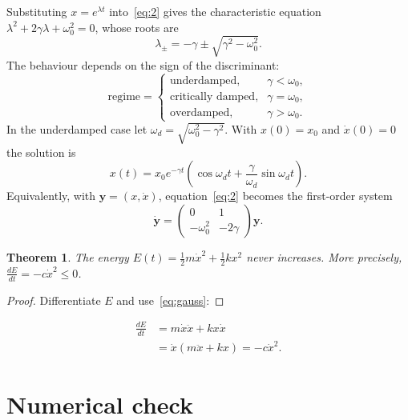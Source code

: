 \documentclass[11pt,a4paper]{article}
\newtheorem{theorem}{Theorem}
\begin{document}
Substituting $x=e^{\lambda t}$ into~\eqref{eq:2} gives the characteristic equation $\lambda^{2}+2\gamma\lambda+\omega_{0}^{2}=0$, whose roots are
\begin{equation}
  \lambda_{\pm}=-\gamma\pm\sqrt{\gamma^{2}-\omega_{0}^{2}}.
\end{equation}
The behaviour depends on the sign of the discriminant:
\begin{equation*}
  \text{regime}=\begin{cases}
\text{underdamped,} & \gamma<\omega_{0}, \\
\text{critically damped,} & \gamma=\omega_{0}, \\
\text{overdamped,} & \gamma>\omega_{0}.
\end{cases}
\end{equation*}
In the underdamped case let $\omega_{d}=\sqrt{\omega_{0}^{2}-\gamma^{2}}$. With $x(0)=x_{0}$ and $\dot{x}(0)=0$ the solution is
\begin{equation}
  x(t)=x_{0}e^{-\gamma t}\left( \cos\omega_{d}t+\frac{\gamma}{\omega_{d}}\sin\omega_{d}t \right).
  \label{eq:cos-dsin}
\end{equation}
Equivalently, with $\mathbf{y}=(x,\dot{x})$, equation~\eqref{eq:2} becomes the first-order system
\begin{equation}
  \dot{\mathbf{y}}=\begin{pmatrix}
0 & 1 \\
-\omega_{0}^{2} & -2\gamma
\end{pmatrix}\mathbf{y}.
\end{equation}

\begin{theorem}
  The energy $E(t)=\frac{1}{2}m\dot{x}^{2}+\frac{1}{2}kx^{2}$ never increases. More precisely, $\frac{dE}{dt}=-c\dot{x}^{2}\leq0$.
\end{theorem}

\begin{proof}
  Differentiate $E$ and use~\eqref{eq:gauss}:
\end{proof}

\begin{align*}
  \frac{dE}{dt} &=m\dot{x}\ddot{x}+kx\dot{x} \\
   &=\dot{x}(m\ddot{x}+kx)=-c\dot{x}^{2}.
\end{align*}

\section{Numerical check}
\end{document}
